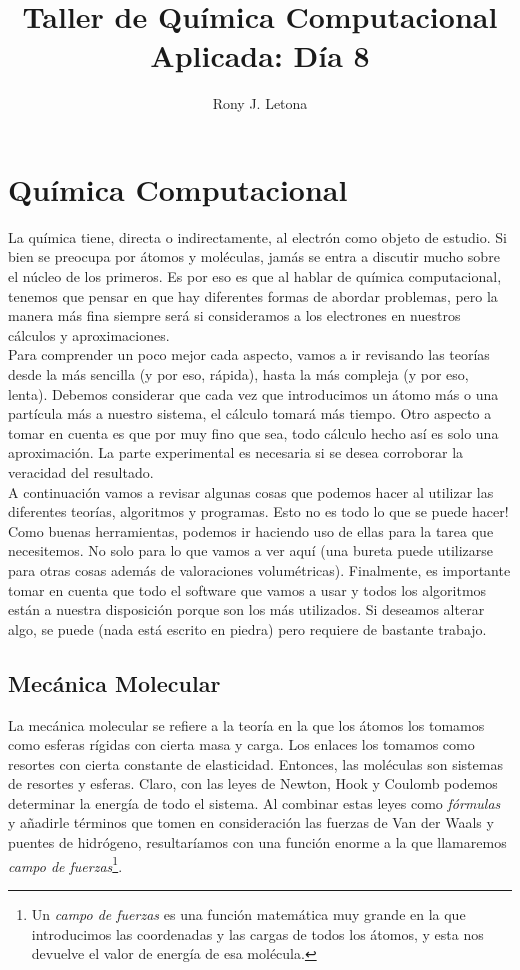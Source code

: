 \documentclass[10pt,letterpaper]{article}
\author{Rony J. Letona}
\title{Taller de Qu\'imica Computacional Aplicada: D\'ia 8}
\begin{document}
\maketitle

\section{Qu\'imica Computacional}
La qu\'imica tiene, directa o indirectamente, al electr\'on como objeto de estudio. Si bien se preocupa por \'atomos y mol\'eculas, jam\'as se entra a discutir mucho sobre el n\'ucleo de los primeros. Es por eso es que al hablar de qu\'imica computacional, tenemos que pensar en que hay diferentes formas de abordar problemas, pero la manera m\'as fina siempre ser\'a si consideramos a los electrones en nuestros c\'alculos y aproximaciones.\\

Para comprender un poco mejor cada aspecto, vamos a ir revisando las teor\'ias desde la m\'as sencilla (y por eso, r\'apida), hasta la m\'as compleja (y por eso, lenta). Debemos considerar que cada vez que introducimos un \'atomo m\'as o una part\'icula m\'as a nuestro sistema, el c\'alculo tomar\'a m\'as tiempo. Otro aspecto a tomar en cuenta es que por muy fino que sea, todo c\'alculo hecho as\'i es solo una aproximaci\'on. La parte experimental es necesaria si se desea corroborar la veracidad del resultado.\\

A continuaci\'on vamos a revisar algunas cosas que podemos hacer al utilizar las diferentes teor\'ias, algoritmos y programas. Esto no es todo lo que se puede hacer! Como buenas herramientas, podemos ir haciendo uso de ellas para la tarea que necesitemos. No solo para lo que vamos a ver aqu\'i (una bureta puede utilizarse para otras cosas adem\'as de valoraciones volum\'etricas). Finalmente, es importante tomar en cuenta que todo el software que vamos a usar y todos los algoritmos est\'an a nuestra disposici\'on porque son los m\'as utilizados. Si deseamos alterar algo, se puede (nada est\'a escrito en piedra) pero requiere de bastante trabajo.

\subsection{Mec\'anica Molecular}
La mec\'anica molecular se refiere a la teor\'ia en la que los \'atomos los tomamos como esferas r\'igidas con cierta masa y carga. Los enlaces los tomamos como resortes con cierta constante de elasticidad. Entonces, las mol\'eculas son sistemas de resortes y esferas. Claro, con las leyes de Newton, Hook y Coulomb podemos determinar la energ\'ia de todo el sistema. Al combinar estas leyes como \emph{f\'ormulas} y a\~nadirle t\'erminos que tomen en consideraci\'on las fuerzas de Van der Waals y puentes de hidr\'ogeno, resultar\'iamos con una funci\'on enorme a la que llamaremos \emph{campo de fuerzas}\footnote{Un \emph{campo de fuerzas} es una funci\'on matem\'atica muy grande en la que introducimos las coordenadas y las cargas de todos los \'atomos, y esta nos devuelve el valor de energ\'ia de esa mol\'ecula.}.\\
\end{document}
